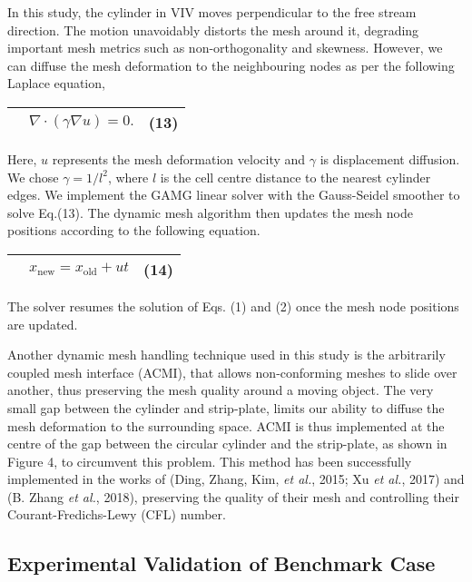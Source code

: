\documentclass[]{article}
\begin{document}
In this study, the cylinder in VIV moves perpendicular to the free
stream direction. The motion unavoidably distorts the mesh around it,
degrading important mesh metrics such as non-orthogonality and skewness.
However, we can diffuse the mesh deformation to the neighbouring nodes
as per the following Laplace equation,

\begin{longtable}[]{@{}lll@{}}
\toprule
& \(\nabla \cdot \left( \gamma\nabla u \right) = 0.\) &
(13)\tabularnewline
\midrule
\endhead
\bottomrule
\end{longtable}

Here, \(u\) represents the mesh deformation velocity and \(\gamma\) is
displacement diffusion. We chose \(\gamma = 1/l^{2}\), where \(l\) is
the cell centre distance to the nearest cylinder edges. We implement the
GAMG linear solver with the Gauss-Seidel smoother to solve Eq.(13). The
dynamic mesh algorithm then updates the mesh node positions according to
the following equation.

\begin{longtable}[]{@{}lll@{}}
\toprule
& \(x_{\text{new}} = x_{\text{old}} + ut\) & (14)\tabularnewline
\midrule
\endhead
\bottomrule
\end{longtable}

The solver resumes the solution of Eqs. (1) and (2) once the mesh node
positions are updated.

Another dynamic mesh handling technique used in this study is the
arbitrarily coupled mesh interface (ACMI), that allows non-conforming
meshes to slide over another, thus preserving the mesh quality around a
moving object. The very small gap between the cylinder and strip-plate,
limits our ability to diffuse the mesh deformation to the surrounding
space. ACMI is thus implemented at the centre of the gap between the
circular cylinder and the strip-plate, as shown in Figure 4, to
circumvent this problem. This method has been successfully implemented
in the works of (Ding, Zhang, Kim, \emph{et al.}, 2015; Xu \emph{et
al.}, 2017) and (B. Zhang \emph{et al.}, 2018), preserving the quality
of their mesh and controlling their Courant-Fredichs-Lewy (CFL) number.

\subsection{\texorpdfstring{\protect\hypertarget{_Ref40998709}{}{\protect\hypertarget{_Toc41048807}{}{}}Experimental
Validation of Benchmark
Case}{Experimental Validation of Benchmark Case}}\label{experimental-validation-of-benchmark-case}
\end{document}
